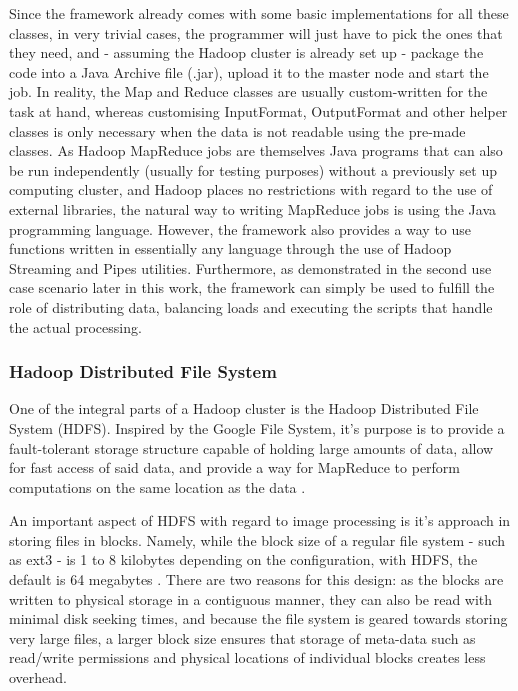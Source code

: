 \documentclass [12pt,a4paper]{report}
\begin{document}
Since the framework already comes with some basic implementations for all these classes, in very trivial cases, the programmer will just have to pick the ones that they need, and - assuming the Hadoop cluster is already set up - package the code into a Java Archive file (.jar), upload it to the master node and start the job. In reality, the Map and Reduce classes are usually custom-written for the task at hand, whereas customising InputFormat, OutputFormat and other helper classes is only necessary when the data is not readable using the pre-made classes. As Hadoop MapReduce jobs are themselves Java programs that can also be run independently (usually for testing purposes) without a previously set up computing cluster, and Hadoop places no restrictions with regard to the use of external libraries, the natural way to writing MapReduce jobs is using the Java programming language. However, the framework also provides a way to use functions written in essentially any language through the use of Hadoop Streaming and Pipes utilities. Furthermore, as demonstrated in the second use case scenario later in this work, the framework can simply be used to fulfill the role of distributing data, balancing loads and executing the scripts that handle the actual processing.

\subsubsection{Hadoop Distributed File System}

One of the integral parts of a Hadoop cluster is the Hadoop Distributed File System (HDFS). Inspired by the Google File System, it's purpose is to provide a fault-tolerant storage structure capable of holding large amounts of data, allow for fast access of said data, and provide a way for MapReduce to perform computations on the same location as the data \cite{ghemawat2003google,borthakur2007hadoop}. 

An important aspect of HDFS with regard to image processing is it's approach in storing files in blocks. Namely, while the block size of a regular file system - such as ext3 - is 1 to 8 kilobytes depending on the configuration, with HDFS, the default is 64 megabytes \cite{ext3}. There are two reasons for this design: as the blocks are written to physical storage in a contiguous manner, they can also be read with minimal disk seeking times, and because the file system is geared towards storing very large files, a larger block size ensures that storage of meta-data such as read/write permissions and physical locations of individual blocks creates less overhead. 
\end{document}
